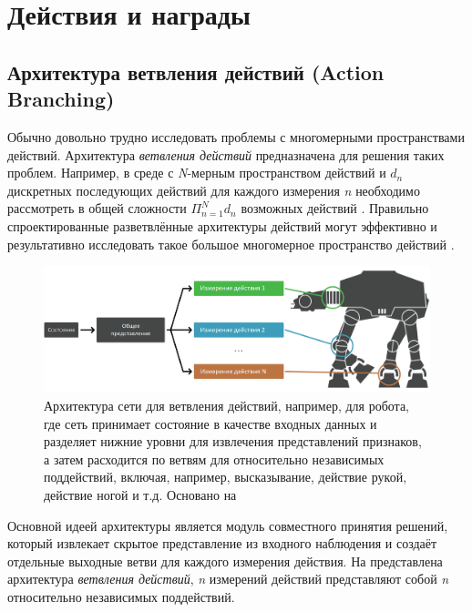 \section{Действия и награды} \label{ch2:act-rew} %

\subsection{Архитектура ветвления действий (Action Branching)}

Обычно довольно трудно исследовать проблемы с многомерными пространствами действий. Архитектура \textit{ветвления действий} предназначена для решения таких проблем. Например, в среде с \textit{N}-мерным пространством действий и $d_n$ дискретных последующих действий для каждого измерения \textit{n} необходимо рассмотреть в общей сложности $\Pi^N_{n=1} d_n$ возможных действий \cite{tavakoli2017action}. Правильно спроектированные разветвлённые архитектуры действий могут эффективно и результативно исследовать такое большое многомерное пространство действий \cite{tavakoli2017action}.

\begin{figure}[ht!]
    \center
    \includegraphics [scale=0.4] {my_folder/images/ch2/action-branching.png}
    \caption{Архитектура сети для ветвления действий, например, для робота, где сеть принимает состояние в качестве входных данных и разделяет нижние уровни для извлечения представлений признаков, а затем расходится по ветвям для относительно независимых поддействий, включая, например, высказывание, действие рукой, действие ногой и т.д. Основано на \cite{tavakoli2017action}}
    \label{fig:ch2-action-branching}
\end{figure}

Основной идеей архитектуры является модуль совместного принятия решений, который извлекает скрытое представление из входного наблюдения и создаёт отдельные выходные ветви для каждого измерения действия. На  представлена архитектура \textit{ветвления действий}, \textit{n} измерений действий представляют собой \textit{n} относительно независимых поддействий.

